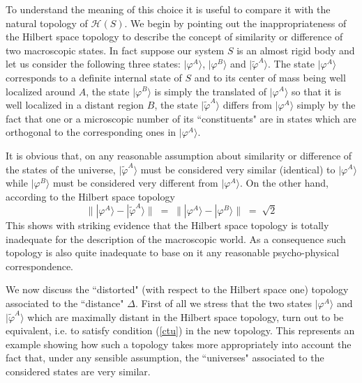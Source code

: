 \documentclass[10pt,a4paper]{article}
\begin{document}
To understand the meaning of this choice it is useful to compare
it with the natural topology of ${\mathcal H}(S)$. We begin by
pointing out the inappropriateness of the Hilbert space topology
to describe the concept of similarity or difference of two
macroscopic states. In fact suppose our system $S$ is an almost
rigid body and let us consider the following three states:
$|\varphi^{A}\rangle$, $|\varphi^{B}\rangle$ and
$|\tilde\varphi^{A}\rangle$. The state $|\varphi^{A}\rangle$
corresponds to a definite internal state of $S$ and to its center
of mass being well localized around $A$, the state
$|\varphi^{B}\rangle$ is simply the translated of
$|\varphi^{A}\rangle$ so that it is well localized in a distant
region $B$, the state $|\tilde\varphi^{A}\rangle$ differs from
$|\varphi^{A}\rangle$ simply by the fact that one or a microscopic
number of its ``constituents" are in states which are orthogonal
to the corresponding ones in $|\varphi^{A}\rangle$.

It is obvious that, on any reasonable assumption about similarity
or difference of the states of the universe,
$|\tilde\varphi^{A}\rangle$ must be considered very similar
(identical) to $|\varphi^{A}\rangle$ while $|\varphi^{B}\rangle$
must be considered very different from $|\varphi^{A}\rangle$. On
the other hand, according to the Hilbert space topology
\begin{equation}
\| |\varphi^{A}\rangle - |\tilde\varphi^{A}\rangle \| \; = \; \|
|\varphi^{A}\rangle - |\varphi^{B}\rangle \| \; = \; \sqrt{2}
\end{equation}
This shows with striking evidence that the Hilbert space topology
is totally inadequate for the description of the macroscopic
world. As a consequence such topology is also quite inadequate to
base on it any reasonable psycho-physical correspondence.

We now discuss the ``distorted" (with respect to the Hilbert space
one) topology associated to the ``distance" $\Delta$. First of all
we stress that the two states $|\varphi^{A}\rangle$ and
$|\tilde\varphi^{A}\rangle$ which are maximally distant in the
Hilbert space topology, turn out to be equivalent, i.e. to satisfy
condition (\ref{ctu}) in the new topology. This represents an
example showing how such a topology takes more appropriately into
account the fact that, under any sensible assumption, the
``universes" associated to the considered states are very similar.
\end{document}
